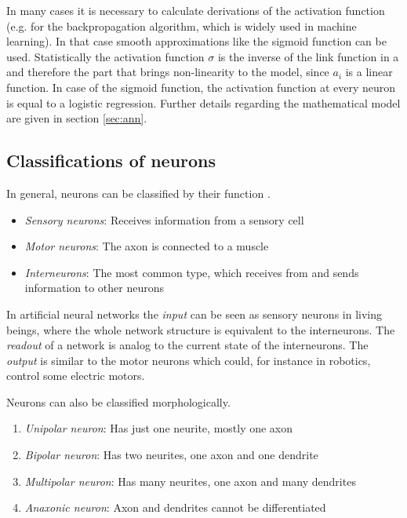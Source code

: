 In many cases it is necessary to calculate derivations of the activation function (e.g. for the backpropagation algorithm, which is widely used in machine learning). In that case smooth approximations like the sigmoid function can be used. Statistically the activation function $\sigma$ is the inverse of the link function in a  and therefore the part that brings non-linearity to the model, since $a_i$ is a linear function. In case of the sigmoid function, the activation function at every neuron is equal to a logistic regression. Further details regarding the mathematical model are given in section \ref{sec:ann}.

\subsection{Classifications of neurons}

In general, neurons can be classified by their function \parencite[p. 39]{schandry2007biologische}.

\begin{itemize}
\item \emph{Sensory neurons}: Receives information from a sensory cell
\item \emph{Motor neurons}: The axon is connected to a muscle
\item \emph{Interneurons}: The most common type, which receives from and sends information to other neurons
\end{itemize}

In artificial neural networks the \emph{input} can be seen as sensory neurons in living beings, where the whole network structure is equivalent to the interneurons. The \emph{readout} of a network is analog to the current state of the interneurons. The \emph{output} is similar to the motor neurons which could, for instance in robotics, control some electric motors.

Neurons can also be classified morphologically.

\begin{enumerate}
\item \emph{Unipolar neuron}: Has just one neurite, mostly one axon
\item \emph{Bipolar neuron}: Has two neurites, one axon and one dendrite
\item \emph{Multipolar neuron}: Has many neurites, one axon and many dendrites
\item \emph{Anaxonic neuron}: Axon and dendrites cannot be differentiated
\end{enumerate}


